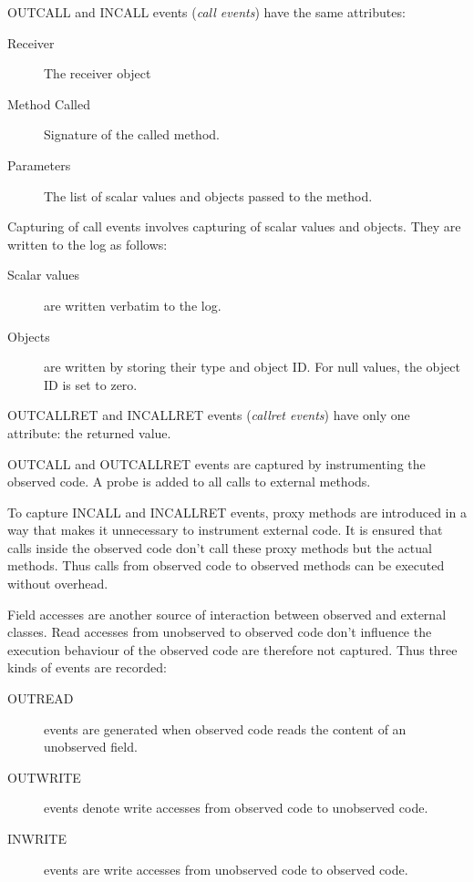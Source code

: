 OUTCALL and INCALL events (\emph {call events})  have the same attributes:

\begin{description}
 \item [Receiver] The receiver object
 \item [Method Called] Signature of the called method.
 \item [Parameters] The list of scalar values and objects passed to the method.
\end{description}

Capturing of call events involves capturing of scalar values and objects. They are written to the log as follows:

\begin{description}
 \item [Scalar values] are written verbatim to the log.
 \item [Objects] are written by storing their type and object ID. For null values, the object ID is set to zero. 
\end{description}

OUTCALLRET and INCALLRET events (\emph{callret events}) have only one attribute: the returned value.

OUTCALL and OUTCALLRET events are captured by instrumenting the observed code. A probe is added to all calls to external methods.

To capture INCALL and INCALLRET events, proxy methods are introduced in a way that makes it unnecessary to instrument external code. It is ensured that calls inside the observed code don't call these proxy methods but the actual methods. Thus calls from observed code to observed methods can be executed without overhead.

Field accesses are another source of interaction between observed and external classes. Read accesses from unobserved to observed code don't influence the execution behaviour of the observed code are therefore not captured. Thus three kinds of events are recorded:

\begin{description}
 \item [OUTREAD] events are generated when observed code reads the content of an unobserved field.
 \item [OUTWRITE] events denote write accesses from observed code to unobserved code.
 \item [INWRITE] events are write accesses from unobserved code to observed code.
\end{description}

